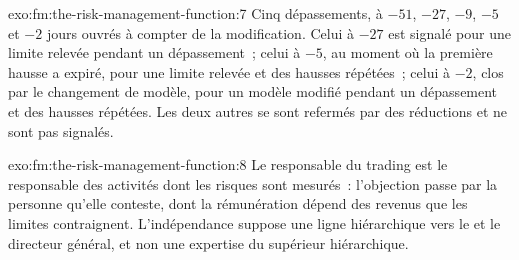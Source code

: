 \begin{solution}{exo:fm:the-risk-management-function:7}
Cinq dépassements, à $-51$, $-27$, $-9$, $-5$ et $-2$ jours ouvrés à compter de la modification. Celui à $-27$ est signalé pour une limite relevée pendant un
dépassement~; celui à $-5$, au moment où la première hausse a expiré, pour une limite relevée et des hausses répétées~; celui à $-2$, clos par le changement de modèle, pour
un modèle modifié pendant un dépassement et des hausses répétées. Les deux autres se sont refermés par des réductions et ne sont pas signalés.
\end{solution}

\begin{solution}{exo:fm:the-risk-management-function:8}
Le responsable du trading est le responsable des activités dont les risques sont mesurés~: l'objection passe par la personne qu'elle conteste, dont la rémunération
dépend des revenus que les limites contraignent. L'indépendance suppose une ligne hiérarchique vers le  et le directeur général, et non
une expertise du supérieur hiérarchique.
\end{solution}

